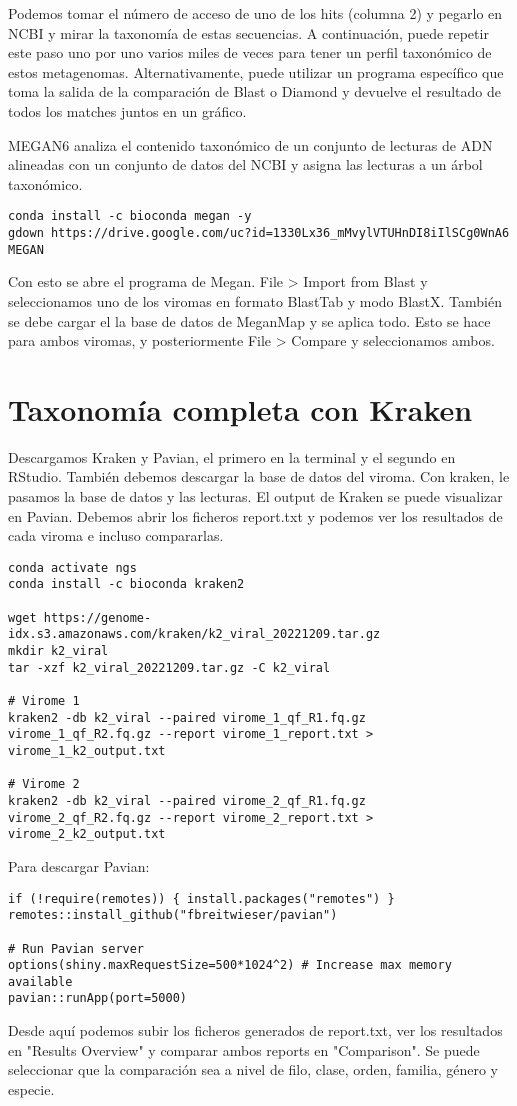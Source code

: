 Podemos tomar el número de acceso de uno de los hits (columna 2) y pegarlo en NCBI y mirar la taxonomía de estas secuencias. A continuación, puede repetir este paso uno por uno varios miles de veces para tener un perfil taxonómico de estos metagenomas. Alternativamente, puede utilizar un programa específico que toma la salida de la comparación de Blast o Diamond y devuelve el resultado de todos los matches juntos en un gráfico. 

MEGAN6 analiza el contenido taxonómico de un conjunto de lecturas de ADN alineadas con un conjunto de datos del NCBI y asigna las lecturas a un árbol taxonómico.
\begin{lstlisting}
conda install -c bioconda megan -y
gdown https://drive.google.com/uc?id=1330Lx36_mMvylVTUHnDI8iIlSCg0WnA6
MEGAN
\end{lstlisting}

Con esto se abre el programa de Megan. File > Import from Blast y seleccionamos uno de los viromas en formato BlastTab y modo BlastX. También se debe cargar el la base de datos de MeganMap y se aplica todo. Esto se hace para ambos viromas, y posteriormente File > Compare y seleccionamos ambos. 

\section{Taxonomía completa con Kraken}
Descargamos Kraken y Pavian, el primero en la terminal y el segundo en RStudio. También debemos descargar la base de datos del viroma. Con kraken, le pasamos la base de datos y las lecturas. El output de Kraken se puede visualizar en Pavian. Debemos abrir los ficheros report.txt y podemos ver los resultados de cada viroma e incluso compararlas. 

\begin{lstlisting}
conda activate ngs
conda install -c bioconda kraken2

wget https://genome-idx.s3.amazonaws.com/kraken/k2_viral_20221209.tar.gz
mkdir k2_viral
tar -xzf k2_viral_20221209.tar.gz -C k2_viral

# Virome 1
kraken2 -db k2_viral --paired virome_1_qf_R1.fq.gz virome_1_qf_R2.fq.gz --report virome_1_report.txt > virome_1_k2_output.txt 

# Virome 2
kraken2 -db k2_viral --paired virome_2_qf_R1.fq.gz virome_2_qf_R2.fq.gz --report virome_2_report.txt > virome_2_k2_output.txt 
\end{lstlisting}

Para descargar Pavian:
\begin{lstlisting}
if (!require(remotes)) { install.packages("remotes") }
remotes::install_github("fbreitwieser/pavian")

# Run Pavian server
options(shiny.maxRequestSize=500*1024^2) # Increase max memory available
pavian::runApp(port=5000)
\end{lstlisting}

Desde aquí podemos subir los ficheros generados de report.txt, ver los resultados en "Results Overview" y comparar ambos reports en "Comparison". Se puede seleccionar que la comparación sea a nivel de filo, clase, orden, familia, género y especie. 